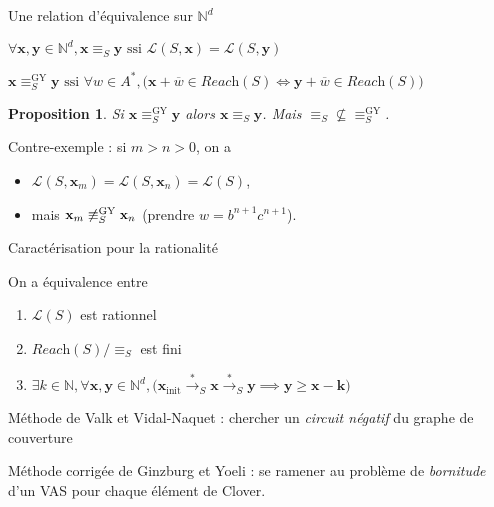 \documentclass[french]{beamer}
\newcommand{\N}{\ensuremath{\mathbb{N}}}
\newcommand{\lang}{\ensuremath{\mathcal{L}}}
\newcommand{\reach}{\ensuremath{\textit{Reach}}}
\newcommand{\trans}[2]{\ensuremath{\stackrel{#1}{\longrightarrow}_{#2}}}
\newcommand{\vect}[1]{\ensuremath{\mathbf{#1}}}
\newcommand{\rel}{\ensuremath{\equiv}}
\newcommand{\relGY}{\ensuremath{\equiv^\text{GY}_S}}
\newcommand{\ssi}{\ensuremath{\text{ ssi }}}
\newcommand{\equivaut}{\ensuremath{\Leftrightarrow}}
\newcommand{\xinit}{\ensuremath{\vect{x}_\text{init}}}
\newcommand{\valeur}[1]{\ensuremath{\overline{#1}}}
\newtheorem{proposition}{Proposition}
\let\oldemph\emph
\renewcommand{\emph}[1]{\oldemph{\color{blue}#1}}
\begin{document}
\begin{frame}{Une relation d'équivalence sur $\N^d$}
\begin{definition} 
$\forall \vect{x},\vect{y}\in\N^d, \vect{x} \rel_S \vect{y} \ssi \lang(S,\vect{x}) = \lang(S,\vect{y})$
\end{definition}

\begin{definition} 
$\vect{x}\relGY\vect{y} \ssi \forall w\in A^\ast, \big( \vect{x} +\valeur{w}\in\reach(S) \equivaut \vect{y} +\valeur{w}\in\reach(S) \big)$
\end{definition}

\begin{proposition}
Si $\vect{x} \relGY \vect{y}$ alors $\vect{x} \rel_S \vect{y}$.
Mais $\rel_S \not\subseteq \relGY$.
\end{proposition}

Contre-exemple : 
si $m>n>0$, on a 
\begin{itemize}
    \item $\lang(S,\vect{x}_m) =\lang(S,\vect{x}_n) =\lang(S)$,
    \item mais $\vect{x}_m \not\relGY \vect{x}_n$ (prendre $w= b^{n+1}c^{n+1}$).
\end{itemize}
\end{frame}


\begin{frame}{Caractérisation pour la rationalité}
\begin{theorem}
On a équivalence entre
\begin{enumerate}
    \item $\lang(S)$ est rationnel
    \item $\reach(S)/\rel_S$ est fini
    \item $\exists k\in\N, \forall \vect{x},\vect{y}\in\N^d, 
\big( \xinit\trans{*}{S} \vect{x} \trans{*}{S} \vect{y}\implies
\vect{y}\geq \vect{x} -\vect{k} \big)$
\end{enumerate}
\end{theorem}

\vspace{5mm}
Méthode de Valk et Vidal-Naquet : 
chercher un \emph{circuit négatif} du graphe de couverture

Méthode corrigée de Ginzburg et Yoeli :
se ramener au problème de \emph{bornitude} d'un VAS pour chaque élément de Clover. 
\end{frame}
\end{document}
